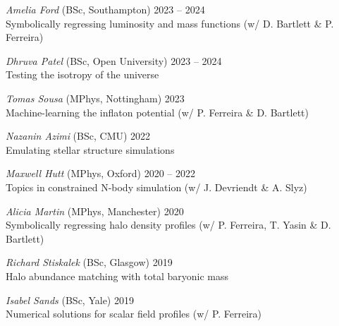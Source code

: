 \documentclass[11pt]{article}
\begin{document}
\textit{Amelia Ford} (BSc, Southampton) \hfill 2023 -- 2024\\
Symbolically regressing luminosity and mass functions (w/ D. Bartlett \& P. Ferreira)\\

\vspace{-0.5\baselineskip}

\textit{Dhruva Patel} (BSc, Open University) \hfill 2023 -- 2024\\
Testing the isotropy of the universe\\

\vspace{-0.5\baselineskip}

\textit{Tomas Sousa} (MPhys, Nottingham) \hfill 2023\\
Machine-learning the inflaton potential (w/ P. Ferreira \& D. Bartlett)\\

\vspace{-0.5\baselineskip}

\textit{Nazanin Azimi} (BSc, CMU) \hfill 2022\\
Emulating stellar structure simulations\\

\vspace{-0.5\baselineskip}

\textit{Maxwell Hutt} (MPhys, Oxford) \hfill 2020 -- 2022\\
Topics in constrained N-body simulation (w/ J. Devriendt \& A. Slyz)\\

\vspace{-0.5\baselineskip}

\textit{Alicia Martin} (MPhys, Manchester) \hfill 2020\\
Symbolically regressing halo density profiles (w/ P. Ferreira, T. Yasin \& D. Bartlett)\\

\vspace{-0.5\baselineskip}

\textit{Richard Stiskalek} (BSc, Glasgow) \hfill 2019\\
Halo abundance matching with total baryonic mass\\

\vspace{-0.5\baselineskip}

\textit{Isabel Sands} (BSc, Yale) \hfill 2019\\
Numerical solutions for scalar field profiles (w/ P. Ferreira)\\
\end{document}
